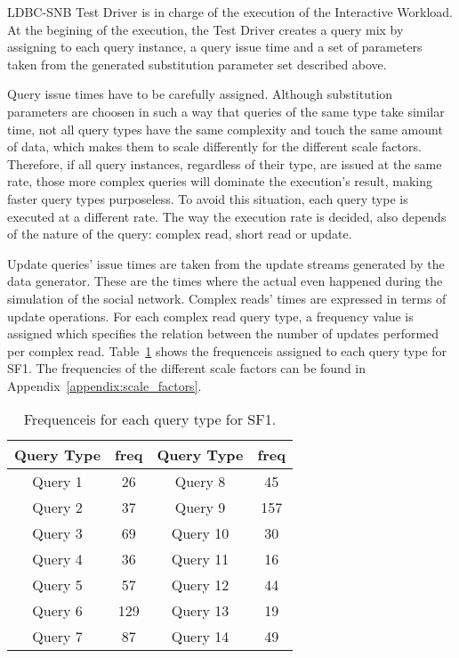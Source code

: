 
LDBC-SNB Test Driver is in charge of the execution of the Interactive Workload.
At the begining of the execution, the Test Driver creates a query mix by
assigning to each query instance, a query issue time and a set of parameters
taken from the generated substitution parameter set described above.  

Query issue times have to be carefully assigned.  Although substitution
parameters are choosen in such a way that queries of the same type take similar
time, not all query types have the same complexity and touch the same amount of
data, which makes them to scale differently for the different scale factors.
Therefore, if all query instances, regardless of their type, are issued
at the same rate, those more complex queries will dominate the execution's
result, making faster query types purposeless. To avoid this situation, each
query type is executed at a different rate. The way the execution rate is decided,
also depends of the nature of the query: complex read, short read or update.

Update queries' issue times are taken from the update streams generated by the
data generator. These are the times where the actual even happened during the
simulation of the social network. Complex reads' times are expressed in terms
of update operations. For each complex read query type, a frequency value is
assigned which specifies the relation between the number of updates performed
per complex read.  Table~\ref{table:freqs} shows the frequenceis assigned to
each query type for SF1. The frequencies of the different scale factors can be
found in Appendix~\ref{appendix:scale_factors}.

\begin{table}[H]
\centering
    \begin{tabular}{|c|c|c|c|}
    \hline
    Query Type & freq & Query Type & freq \\ 
    \hline
    \hline
    Query 1 & 26 & Query 8 & 45 \\ 
    \hline       
    Query 2 & 37 & Query 9 & 157 \\  
    \hline        
    Query 3 & 69 & Query 10 & 30 \\ 
    \hline        
    Query 4 & 36 & Query 11 & 16 \\ 
    \hline        
    Query 5 & 57 & Query 12 & 44 \\ 
    \hline        
    Query 6 & 129 & Query 13 & 19 \\  
    \hline        
    Query 7 & 87 & Query 14 & 49 \\ 
    \hline
    \end{tabular}
    \caption{Frequenceis for each query type for SF1.}
    \label{table:freqs}
\end{table}

